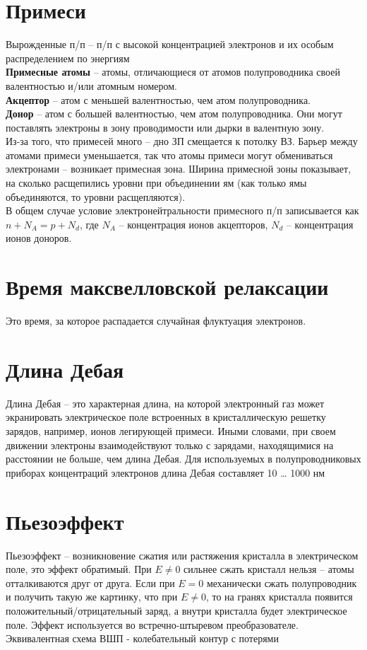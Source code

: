 \begin{multicols*}{2}
		\section{Примеси}
		Вырожденные п/п – п/п с высокой концентрацией электронов и их особым распределением по энергиям\\
		\textbf{Примесные атомы} – атомы, отличающиеся от атомов полупроводника своей валентностью и/или атомным номером.\\
		\textbf{Акцептор} – атом с меньшей валентностью, чем атом полупроводника.\\
		\textbf{Донор} – атом с большей валентностью, чем атом полупроводника. Они могут поставлять электроны в зону проводимости или дырки в валентную зону.\\
		Из-за того, что примесей много – дно ЗП смещается к потолку ВЗ. Барьер между атомами примеси уменьшается, так что атомы примеси могут обмениваться электронами – возникает примесная зона. Ширина примесной зоны показывает, на сколько расщепились уровни при объединении ям (как только ямы объединяются, то уровни расщепляются).\\
		В общем случае условие электронейтральности примесного п/п записывается как $n + N_A = p + N_d$, где $N_A$ – концентрация ионов акцепторов, $N_d$ – концентрация ионов доноров.

		\section{Время максвелловской релаксации}
		Это время, за которое распадается случайная флуктуация электронов.

		\section{Длина Дебая}
		Длина Дебая – это характерная длина, на которой электронный газ может экранировать электрическое поле встроенных в кристаллическую решетку зарядов, например, ионов легирующей примеси. Иными словами, при своем движении электроны взаимодействуют только с зарядами, находящимися на расстоянии не больше, чем длина Дебая. Для используемых в полупроводниковых приборах концентраций электронов длина Дебая составляет 10 … 1000 нм

		\section{Пьезоэффект}
		Пьезоэффект – возникновение сжатия или растяжения кристалла в электрическом поле, это эффект обратимый. При $E\neq 0$ сильнее сжать кристалл нельзя – атомы отталкиваются друг от друга. Если при $E = 0$ механически сжать полупроводник и получить такую же картинку, что при $E\neq 0$, то на гранях кристалла появится положительный/отрицательный заряд, а внутри кристалла будет электрическое поле. Эффект используется во встречно-штыревом преобразователе. Эквивалентная схема ВШП - колебательный контур с потерями


\end{multicols*}
